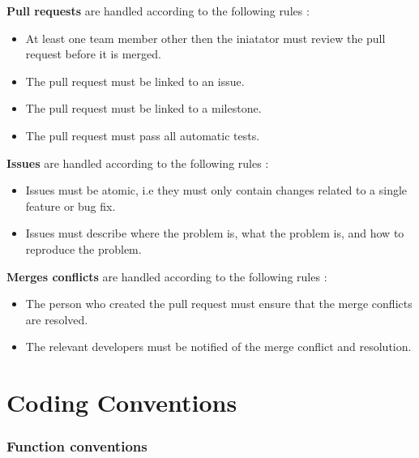 \documentclass[11pt,a4paper]{article}
\begin{document}
\textbf{Pull requests} are handled according to the following rules : 
\begin{itemize}
    \item[\textbullet] At least one team member other then the iniatator must review the pull request before it is merged.
    \item[\textbullet] The pull request must be linked to an issue.
    \item[\textbullet] The pull request must be linked to a milestone.
    \item[\textbullet] The pull request must pass all automatic tests.
\end{itemize}


\textbf{Issues} are handled according to the following rules : 
\begin{itemize}
    \item[\textbullet] Issues must be atomic, i.e they must only contain changes related to a single feature or bug fix.
    \item[\textbullet] Issues must describe where the problem is, what the problem is, and how to reproduce the problem.
\end{itemize}

\textbf{Merges conflicts} are handled according to the following rules : 
\begin{itemize}
    \item[\textbullet] The person who created the pull request must ensure that the merge conflicts are resolved.
    \item[\textbullet] The relevant developers must be notified of the merge conflict and resolution.
\end{itemize}


\section*{Coding Conventions}

\subsubsection*{Function conventions}
\end{document}
